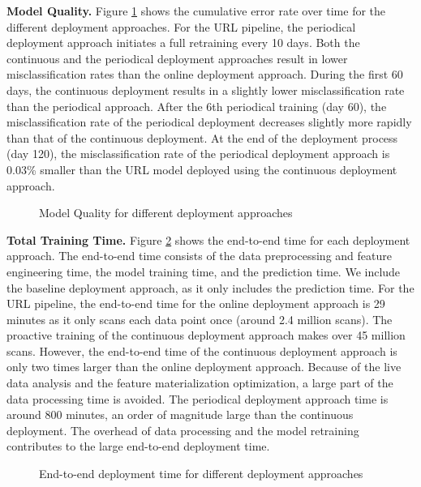 \textbf{Model Quality. }
Figure \ref{deployment-quality-figure} shows the cumulative error rate over time for the different deployment approaches.
For the URL pipeline, the periodical deployment approach initiates a full retraining every 10 days.
Both the continuous and the periodical deployment approaches result in lower misclassification rates than the online deployment approach.
During the first 60 days, the continuous deployment results in a slightly lower misclassification rate than the periodical approach.
After the 6th periodical training (day 60), the misclassification rate of the periodical deployment decreases slightly more rapidly than that of the continuous deployment. 
At the end of the deployment process (day 120), the misclassification rate of the periodical deployment approach is 0.03\% smaller than the URL model deployed using the continuous deployment approach.
\begin{figure}[h!]
\centering
\resizebox{\columnwidth}{!}{}
\caption{Model Quality for different deployment approaches}
\label{deployment-quality-figure}
\end{figure}

\textbf{Total Training Time. }
Figure \ref{deployment-time-figure} shows the end-to-end  time for each deployment approach.
The end-to-end time consists of the data preprocessing and feature engineering time, the model training time, and the prediction time. 
We include the baseline deployment approach, as it only includes the prediction time.
For the URL pipeline, the end-to-end time for the online deployment approach is 29 minutes as it only scans each data point once (around 2.4 million scans).  
The proactive training of the continuous deployment approach makes over 45 million scans.
However, the end-to-end time of the continuous deployment approach is only two times larger than the online deployment approach. 
Because of the live data analysis and the feature materialization optimization, a large part of the data processing time is avoided.
The periodical deployment approach time is around 800 minutes, an order of magnitude large than the continuous deployment. 
The overhead of data processing and the model retraining contributes to the large end-to-end deployment time.

\begin{figure}[h!]
\centering
\resizebox{\columnwidth}{!}{}
\caption{End-to-end deployment time for different deployment approaches}
\label{deployment-time-figure}
\end{figure}

